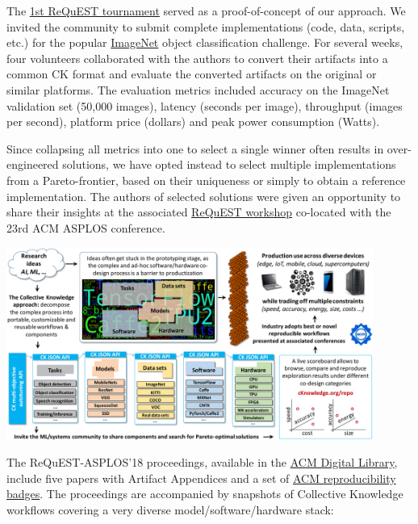 \documentclass[10pt,onecolumn]{article}
\begin{document}
The \href{http://cknowledge.org/request-cfp-asplos2018.html}{1st ReQuEST tournament} 
served as a proof-of-concept of our approach. We invited the community to submit complete
implementations (code, data, scripts, etc.) for the popular
\href{http://www.image-net.org}{ImageNet} object classification challenge. For several weeks,
four volunteers collaborated with the authors to convert their
artifacts into a common CK format and evaluate the converted
artifacts on the original or similar platforms. The evaluation
metrics included accuracy on the ImageNet validation set
(50,000 images), latency (seconds per image), throughput
(images per second), platform price (dollars) and peak power
consumption (Watts).

Since collapsing all metrics into one to select a single
winner often results in over-engineered solutions, we have
opted instead to select multiple implementations from
a Pareto-frontier, based on their uniqueness or simply
to obtain a reference implementation. The authors of
selected solutions were given an opportunity to share their
insights at the associated \href{http://cknowledge.org/request-cfp-asplos2018.html}{ReQuEST workshop} 
co-located with the 23rd ACM ASPLOS conference.

\begin{center}
\includegraphics[width=0.9\textwidth]{figures/ck-request-concept-cropped.pdf}
\end{center}

The ReQuEST-ASPLOS'18 proceedings, available in the 
\href{https://dl.acm.org}{ACM Digital Library}, include five papers with Artifact Appendices
and a set of \href{https://www.acm.org/publications/policies/artifact-review-badging}{ACM reproducibility badges}. 
The proceedings are accompanied by snapshots of Collective Knowledge workflows
covering a very diverse model/software/hardware stack:
\end{document}
